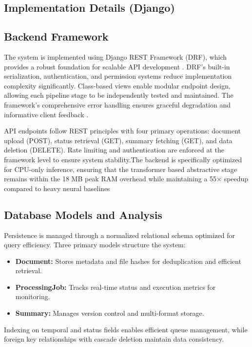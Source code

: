 \documentclass[conference]{IEEEtran}
\begin{document}
\begin{itemize}
\section{Implementation Details (Django)}

\subsection{Backend Framework}
The system is implemented using Django REST Framework (DRF), which provides a robust foundation for scalable API development \cite{13}. DRF's built-in serialization, authentication, and permission systems reduce implementation complexity significantly. Class-based views enable modular endpoint design, allowing each pipeline stage to be independently tested and maintained. The framework's comprehensive error handling ensures graceful degradation and informative client feedback \cite{13, 16}.

API endpoints follow REST principles with four primary operations: document upload (POST), status retrieval (GET), summary fetching (GET), and data deletion (DELETE). Rate limiting and authentication are enforced at the framework level to ensure system stability.The backend is specifically optimized for CPU-only inference, ensuring that the transformer
based abstractive stage remains within the 18 MB peak RAM overhead while maintaining a 55× speedup compared to heavy neural baselines


\subsection{Database Models and Analysis}
Persistence is managed through a normalized relational schema\cite{13} optimized for query efficiency. Three primary models structure the system: 
\begin{itemize}
    \item \textbf{Document:} Stores metadata and file hashes for deduplication and efficient retrieval.
    \item \textbf{ProcessingJob:} Tracks real-time status and execution metrics for monitoring\cite{13}.
    \item \textbf{Summary:} Manages version control and multi-format storage\cite{13}.
\end{itemize}
Indexing on temporal and status fields enables efficient queue management\cite{13}, while foreign key relationships with cascade deletion maintain data consistency.
\renewcommand{\arraystretch}{1.2}



\end{itemize}
\end{document}
